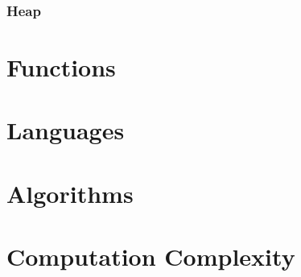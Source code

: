 \subsubsection{Heap}

\section{Functions}

\section{Languages}

\section{Algorithms}

\appendix

\section{Computation Complexity}

